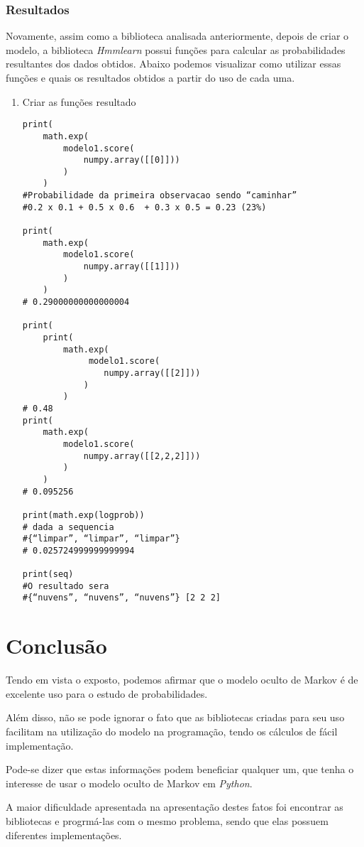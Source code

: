 \documentclass{article}
\begin{document}
\subsubsection{Resultados}
Novamente, assim como a biblioteca analisada anteriormente, depois de criar o modelo, a biblioteca \emph{Hmmlearn} possui funções para calcular as probabilidades resultantes dos dados obtidos. Abaixo podemos visualizar como utilizar essas funções e quais os resultados obtidos a partir do uso de cada uma.
\begin{enumerate}
    
\item Criar as funções resultado

\begin{verbatim}
print(
    math.exp(
        modelo1.score(
            numpy.array([[0]]))
        )
    )
#Probabilidade da primeira observacao sendo “caminhar” 
#0.2 x 0.1 + 0.5 x 0.6  + 0.3 x 0.5 = 0.23 (23%)

print(
    math.exp(
        modelo1.score(
            numpy.array([[1]]))
        )
    )
# 0.29000000000000004

print(
    print(
        math.exp(
             modelo1.score(
                numpy.array([[2]]))
            )
        )
# 0.48
print(
    math.exp(
        modelo1.score(
            numpy.array([[2,2,2]]))
        )
    )
# 0.095256

print(math.exp(logprob))
# dada a sequencia 
#{“limpar”, “limpar”, “limpar”}
# 0.025724999999999994

print(seq)  
#O resultado sera
#{“nuvens”, “nuvens”, “nuvens”} [2 2 2]

\end{verbatim}

\end{enumerate}
\section{Conclusão}
Tendo em vista o exposto, podemos afirmar que o modelo oculto de Markov é de excelente uso para o estudo de probabilidades. 

Além disso, não se pode ignorar o fato que as bibliotecas criadas para seu uso facilitam na utilização do modelo na programação, tendo os cálculos de fácil implementação. 

Pode-se dizer que estas informações podem beneficiar qualquer um, que tenha o interesse de usar o modelo oculto de Markov em \emph{Python}.

A maior dificuldade apresentada na apresentação destes fatos foi encontrar as bibliotecas e progrmá-las com o mesmo problema, sendo que elas possuem diferentes implementações.
\end{document}

